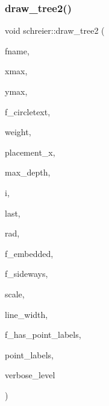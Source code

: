 \mbox{\label{classschreier_a14e8c3fab2da3d45f1602daf0ca2b3f0}} 
\subsubsection{\texorpdfstring{draw\+\_\+tree2()}{draw\_tree2()}}
{\footnotesize\ttfamily void schreier\+::draw\+\_\+tree2 (\begin{DoxyParamCaption}\item[{char $\ast$}]{fname,  }\item[{\mbox{\hyperlink{galois_8h_a09fddde158a3a20bd2dcadb609de11dc}{I\+NT}}}]{xmax,  }\item[{\mbox{\hyperlink{galois_8h_a09fddde158a3a20bd2dcadb609de11dc}{I\+NT}}}]{ymax,  }\item[{\mbox{\hyperlink{galois_8h_a09fddde158a3a20bd2dcadb609de11dc}{I\+NT}}}]{f\+\_\+circletext,  }\item[{\mbox{\hyperlink{galois_8h_a09fddde158a3a20bd2dcadb609de11dc}{I\+NT}} $\ast$}]{weight,  }\item[{\mbox{\hyperlink{galois_8h_a09fddde158a3a20bd2dcadb609de11dc}{I\+NT}} $\ast$}]{placement\+\_\+x,  }\item[{\mbox{\hyperlink{galois_8h_a09fddde158a3a20bd2dcadb609de11dc}{I\+NT}}}]{max\+\_\+depth,  }\item[{\mbox{\hyperlink{galois_8h_a09fddde158a3a20bd2dcadb609de11dc}{I\+NT}}}]{i,  }\item[{\mbox{\hyperlink{galois_8h_a09fddde158a3a20bd2dcadb609de11dc}{I\+NT}}}]{last,  }\item[{\mbox{\hyperlink{galois_8h_a09fddde158a3a20bd2dcadb609de11dc}{I\+NT}}}]{rad,  }\item[{\mbox{\hyperlink{galois_8h_a09fddde158a3a20bd2dcadb609de11dc}{I\+NT}}}]{f\+\_\+embedded,  }\item[{\mbox{\hyperlink{galois_8h_a09fddde158a3a20bd2dcadb609de11dc}{I\+NT}}}]{f\+\_\+sideways,  }\item[{double}]{scale,  }\item[{double}]{line\+\_\+width,  }\item[{\mbox{\hyperlink{galois_8h_a09fddde158a3a20bd2dcadb609de11dc}{I\+NT}}}]{f\+\_\+has\+\_\+point\+\_\+labels,  }\item[{\mbox{\hyperlink{galois_8h_a09fddde158a3a20bd2dcadb609de11dc}{I\+NT}} $\ast$}]{point\+\_\+labels,  }\item[{\mbox{\hyperlink{galois_8h_a09fddde158a3a20bd2dcadb609de11dc}{I\+NT}}}]{verbose\+\_\+level }\end{DoxyParamCaption})}

